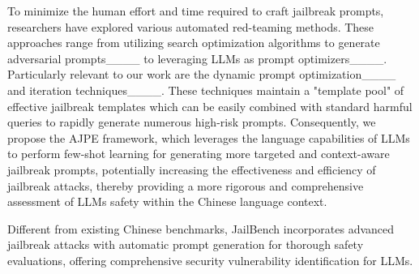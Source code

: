 To minimize the human effort and time required to craft jailbreak prompts, researchers have explored various automated red-teaming methods. These approaches range from utilizing search optimization algorithms to generate adversarial prompts____ to leveraging LLMs as prompt optimizers____. Particularly relevant to our work are the dynamic prompt optimization____ and iteration techniques____. These techniques maintain a "template pool" of effective jailbreak templates which can be easily combined with standard harmful queries to rapidly generate numerous high-risk prompts. Consequently, we propose the AJPE framework, which leverages the language capabilities of LLMs to perform few-shot learning for generating more targeted and context-aware jailbreak prompts, potentially increasing the effectiveness and efficiency of jailbreak attacks, thereby providing a more rigorous and comprehensive assessment of LLMs safety within the Chinese language context.

Different from existing Chinese benchmarks, JailBench incorporates advanced jailbreak attacks with automatic prompt generation for thorough safety evaluations, offering comprehensive security vulnerability identification for LLMs.